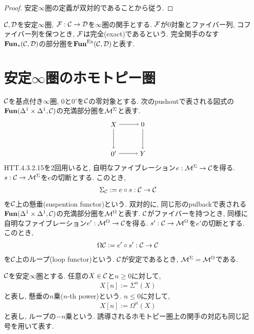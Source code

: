 \documentclass[uplatex, a4paper, 14Q, dvipdfmx]{jsarticle}
\begin{document}
\begin{proof}
  安定$\infty$圏の定義が双対的であることから従う. 
\end{proof}

\begin{definition}[完全関手]
  $\mathcal{C},\mathcal{D}$を安定$\infty$圏, $\mathcal{F} : \mathcal{C} \to \mathcal{D}$を$\infty$圏の関手とする.
  $\mathcal{F}$が$0$対象とファイバー列, コファイバー列を保つとき, $\mathcal{F}$は完全(exact)であるという.
  完全関手のなす$\mathbf{Fun}_\ast(\mathcal{C},\mathcal{D})$の部分圏を$\mathbf{Fun}^{\mathrm{Ex}}(\mathcal{C},\mathcal{D})$と表す. 
\end{definition}


\section{安定\texorpdfstring{$\infty$}{infty}圏のホモトピー圏}

$\mathcal{C}$を基点付き$\infty$圏, $0$と$0'$を$\mathcal{C}$の零対象とする. 
次のpushoutで表される図式の$\mathbf{Fun}(\Delta^1 \times \Delta^1,\mathcal{C})$の充満部分圏を$\mathcal{M}^\Sigma$と表す. 
\[
  \begin{tikzpicture}[auto,->]
    \node (0') at (0,0) {$0'$};
    \node (Y) at (1.5,0) {$Y$};
    \node (X) at (0,1.5) {$X$};
    \node (0) at (1.5,1.5) {$0$};
    \draw (X) -- (0);
    \draw (X) -- (0');
    \draw (0') -- (Y);
    \draw (0) -- (Y);
  \end{tikzpicture}
\]
HTT.4.3.2.15を2回用いると, 自明なファイブレーション$e : \mathcal{M}^\Sigma \to \mathcal{C}$を得る. 
$s : \mathcal{C} \to \mathcal{M}^\Sigma$を$e$の切断とする.
このとき, 
\begin{align*}
  \Sigma_{\mathcal{C}} := e \circ s : \mathcal{C} \to \mathcal{C}
\end{align*}
を$\mathcal{C}$上の懸垂(suspention functor)という. 
双対的に, 同じ形のpulbackで表される$\mathbf{Fun}(\Delta^1 \times \Delta^1,\mathcal{C})$の充満部分圏を$\mathcal{M}^\Omega$と表す. 
$\mathcal{C}$がファイバーを持つとき, 同様に自明なファイブレーション$e' : \mathcal{M}^\Omega \to \mathcal{C}$を得る. 
$s' : \mathcal{C} \to \mathcal{M}^\Omega$を$e'$の切断とする.
このとき, 
\begin{align*}
  \Omega\mathcal{C} := e' \circ s' : \mathcal{C} \to \mathcal{C}
\end{align*}
を$\mathcal{C}$上のループ(loop functor)という. 
$\mathcal{C}$が安定であるとき, $\mathcal{M}^\Sigma = \mathcal{M}^\Omega$である. 

\begin{notation}
  $\mathcal{C}$を安定$\infty$圏とする.
  任意の$X \in \mathcal{C}$と$n \geq 0$に対して, 
  \begin{align*}
    X[n] := \Sigma^n(X)
  \end{align*}
  と表し, 懸垂の$n$乗($n$-th power)という. 
  $n \leq 0$に対して, 
  \begin{align*}
    X[n] := \Omega^n(X) 
  \end{align*}
  と表し, ループの$-n$乗という. 
  誘導されるホモトピー圏上の関手の対応も同じ記号を用いて表す.
\end{notation}
\end{document}
